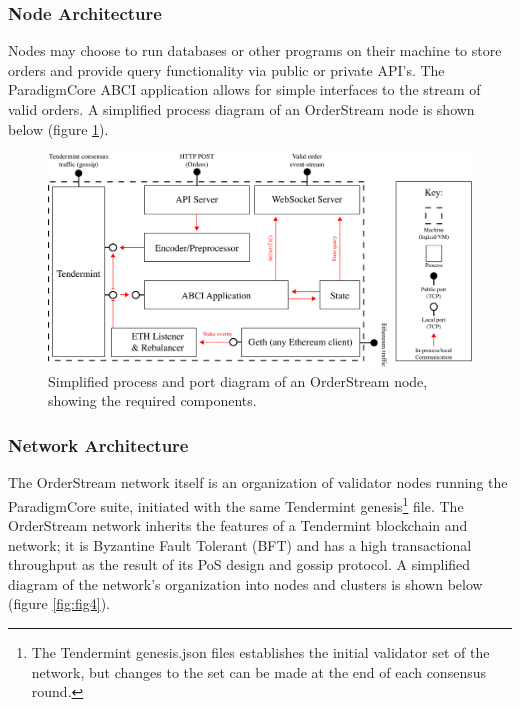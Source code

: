 \documentclass[9pt]{article}
\begin{document}
\subsubsection{Node Architecture}\label{node architecture}

\noindent Nodes may choose to run databases or other programs on their machine to store orders and provide query functionality via public or private API’s. The ParadigmCore ABCI application allows for simple interfaces to the stream of valid orders. A simplified process diagram of an OrderStream node is shown below (figure \ref{fig:fig3}).

\begin{figure}[H]
    \centering
    \includegraphics[scale=0.4]{../figures/fig3.pdf}
    \caption{Simplified process and port diagram of an OrderStream node, showing the required components. }
    \label{fig:fig3}
\end{figure}

\subsubsection{Network Architecture}\label{network architecture}

\noindent The OrderStream network itself is an organization of validator nodes running the ParadigmCore suite, initiated with the same Tendermint genesis\footnote{The Tendermint genesis.json files establishes the initial validator set of the network, but changes to the set can be made at the end of each consensus round.} file. The OrderStream network inherits the features of a Tendermint blockchain and network; it is Byzantine Fault Tolerant (BFT)\cite{bft} and has a high transactional throughput as the result of its PoS design and gossip protocol. A simplified diagram of the network’s organization into nodes and clusters is shown below (figure \ref{fig:fig4}). 
\end{document}
